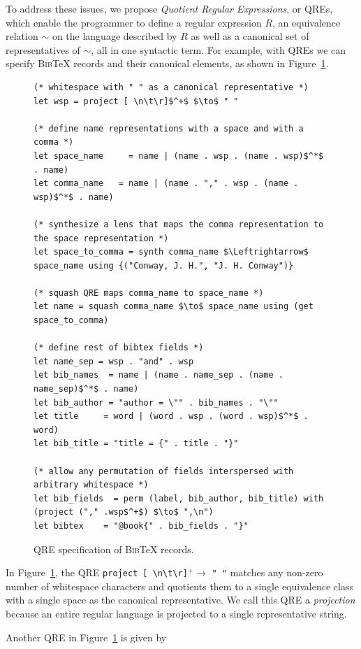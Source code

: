 \documentclass[acmsmall,review,anonymous]{acmart}\settopmatter{printfolios=true,printccs=false,printacmref=false}
\newcommand{\bibtex}{\textsc{Bib}\TeX{}}
\begin{document}
To address these issues, we propose {\em Quotient Regular Expressions}, or QREs,
which enable the programmer to define a regular expression $R$, an equivalence
relation $\sim$ on the language described by $R$ as well as a canonical set
of representatives of $\sim$, all in one syntactic term. For example, with QREs
we can specify \bibtex{} records and their canonical elements, as shown in
Figure~\ref{fig:example-qre}.

\begin{figure}[t]
\begin{lstlisting}
(* whitespace with " " as a canonical representative *)
let wsp = project [ \n\t\r]$^+$ $\to$ " "

(* define name representations with a space and with a comma *)
let space_name     = name | (name . wsp . (name . wsp)$^*$ . name)
let comma_name   = name | (name . "," . wsp . (name . wsp)$^*$ . name)

(* synthesize a lens that maps the comma representation to the space representation *)
let space_to_comma = synth comma_name $\Leftrightarrow$ space_name using {("Conway, J. H.", "J. H. Conway")}

(* squash QRE maps comma_name to space_name *)
let name = squash comma_name $\to$ space_name using (get space_to_comma)

(* define rest of bibtex fields *)
let name_sep = wsp . "and" . wsp
let bib_names  = name | (name . name_sep . (name . name_sep)$^*$ . name)
let bib_author = "author = \"" . bib_names . "\""
let title     = word | (word . wsp . (word . wsp)$^*$ . word)
let bib_title = "title = {" . title . "}"

(* allow any permutation of fields interspersed with arbitrary whitespace *)
let bib_fields  = perm (label, bib_author, bib_title) with (project ("," .wsp$^+$) $\to$ ",\n")
let bibtex    = "@book{" . bib_fields . "}"
\end{lstlisting}
\caption{QRE specification of \bibtex{} records. }
\label{fig:example-qre}
\end{figure}

In Figure~\ref{fig:example-qre}, the QRE \verb+project [ \n\t\r]+$^{+} \to$
\verb+" "+ matches any non-zero number of whitespace characters and quotients
them to a single equivalence class with a single space as the canonical
representative. We call this QRE a \textit{projection} because an entire regular
language is projected to a single representative string.

Another QRE in Figure~\ref{fig:example-qre} is given by
\end{document}
